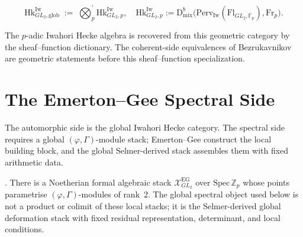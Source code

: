 \begin{definition}
\label{v4-arith:def:global-iwahori-hecke}
\begin{equation}
\mathrm{Hk}^{\mathrm{Iw}}_{GL_{2},\mathrm{glob}}\;:=\;\bigotimes_{p}^{\prime}\mathrm{Hk}^{\mathrm{Iw}}_{GL_{2},p},\quad
\mathrm{Hk}^{\mathrm{Iw}}_{GL_{2},p}:=
\mathrm{D}^{b}_{\mathrm{mix}}\bigl(\mathrm{Perv}_{\mathrm{Iw}}(\mathrm{Fl}_{GL_{2},\overline{\mathbb F}_{p}}),\mathrm{Fr}_{p}\bigr).
\end{equation}
\end{definition}

\begin{remark}
The \(p\)-adic Iwahori Hecke algebra is recovered from this geometric
category by the sheaf--function dictionary. The coherent-side
equivalences of Bezrukavnikov are geometric statements before this
sheaf--function specialization.
\end{remark}

\section{The Emerton--Gee Spectral Side}
\label{v4-arith:bb:emerton-gee}

The automorphic side is the global Iwahori Hecke category. The spectral
side requires a global \((\varphi,\Gamma)\)-module stack; Emerton--Gee
construct the local building block, and the global Selmer-derived stack
assembles them with fixed arithmetic data.

\begin{theorem}
\label{v4-arith:thm:emerton-gee}
\ClaimStatusProvedElsewhere. There is a Noetherian formal algebraic
stack \(\mathcal{X}^{\mathrm{EG}}_{GL_{2}}\) over \(\mathrm{Spec}\,\mathbb{Z}_{p}\)
whose points parametrise \((\varphi,\Gamma)\)-modules of rank~\(2\).
The global spectral object used below is not a product or colimit of
these local stacks; it is the Selmer-derived global deformation stack
with fixed residual representation, determinant, and local
conditions.
\end{theorem}

